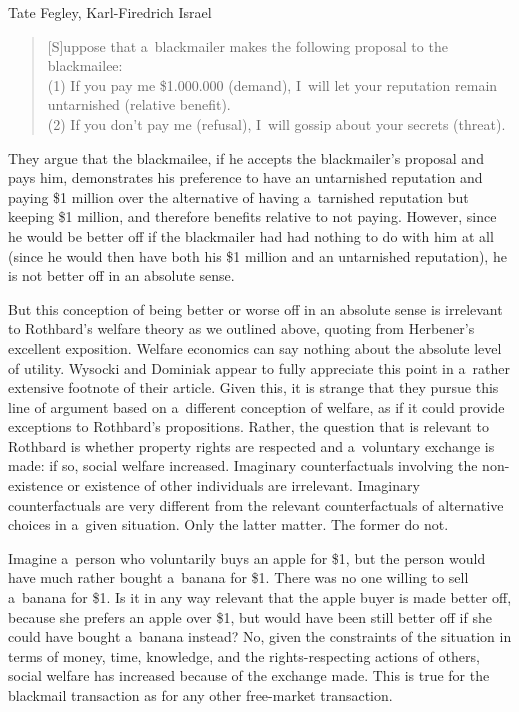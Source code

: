 \begin{artengenv2auth}{Tate Fegley, Karl-Firedrich Israel}
\begin{quote}
[S]uppose that a~blackmailer makes the following proposal to the blackmailee:\\
(1) If you pay me \$1.000.000 (demand), I~will let your reputation remain untarnished (relative benefit).\\
(2) If you don't pay me (refusal), I~will gossip about your secrets (threat).
\end{quote}
They argue that the blackmailee, if he accepts the blackmailer's proposal and pays him, demonstrates his preference to have an untarnished reputation and paying \$1 million over the alternative of having a~tarnished reputation but keeping \$1 million, and therefore benefits relative to not paying. However, since he would be better off if the blackmailer had had nothing to do with him at all (since he would then have both his \$1 million and an untarnished reputation), he is not better off in an absolute sense.



But this conception of being better or worse off in an absolute sense is irrelevant to Rothbard's welfare theory as we outlined above, quoting from Herbener's 
\parencite*[][p.63]{herbener_defense_2008} %
 excellent exposition. Welfare economics can say nothing about the absolute level of utility. Wysocki and Dominiak 
\parencite*[][fn. 12]{wysocki_how_2023} %
 appear to fully appreciate this point in a~rather extensive footnote of their article. Given this, it is strange that they pursue this line of argument based on a~different conception of welfare, as if it could provide exceptions to Rothbard's propositions. Rather, the question that is relevant to Rothbard is whether property rights are respected and a~voluntary exchange is made: if so, social welfare increased. Imaginary counterfactuals involving the non-existence or existence of other individuals are irrelevant. Imaginary counterfactuals are very different from the relevant counterfactuals of alternative choices in a~given situation. Only the latter matter. The former do not.



Imagine a~person who voluntarily buys an apple for \$1, but the person would have much rather bought a~banana for \$1. There was no one willing to sell a~banana for \$1. Is it in any way relevant that the apple buyer is made better off, because she prefers an apple over \$1, but would have been still better off if she could have bought a~banana instead? No, given the constraints of the situation in terms of money, time, knowledge, and the rights-respecting actions of others, social welfare has increased because of the exchange made. This is true for the blackmail transaction as for any other free-market transaction.




\end{artengenv2auth}
